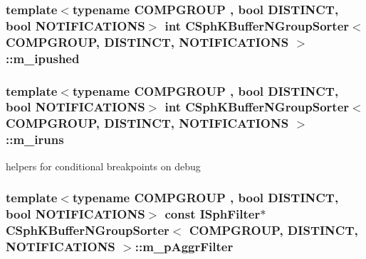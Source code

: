 \hypertarget{classCSphKBufferNGroupSorter_a3308b6c1f46dc67f83b9c032411c5511}{
\subsubsection[{m\-\_\-ipushed}]{\setlength{\rightskip}{0pt plus 5cm}template$<$typename C\-O\-M\-P\-G\-R\-O\-U\-P , bool D\-I\-S\-T\-I\-N\-C\-T, bool N\-O\-T\-I\-F\-I\-C\-A\-T\-I\-O\-N\-S$>$ {\bf int} {\bf C\-Sph\-K\-Buffer\-N\-Group\-Sorter}$<$ C\-O\-M\-P\-G\-R\-O\-U\-P, D\-I\-S\-T\-I\-N\-C\-T, N\-O\-T\-I\-F\-I\-C\-A\-T\-I\-O\-N\-S $>$\-::m\-\_\-ipushed\hspace{0.3cm}{\ttfamily [protected]}}}\label{classCSphKBufferNGroupSorter_a3308b6c1f46dc67f83b9c032411c5511}
\hypertarget{classCSphKBufferNGroupSorter_a699681aaca6fb381c56b824f1844b4e3}{
\subsubsection[{m\-\_\-iruns}]{\setlength{\rightskip}{0pt plus 5cm}template$<$typename C\-O\-M\-P\-G\-R\-O\-U\-P , bool D\-I\-S\-T\-I\-N\-C\-T, bool N\-O\-T\-I\-F\-I\-C\-A\-T\-I\-O\-N\-S$>$ {\bf int} {\bf C\-Sph\-K\-Buffer\-N\-Group\-Sorter}$<$ C\-O\-M\-P\-G\-R\-O\-U\-P, D\-I\-S\-T\-I\-N\-C\-T, N\-O\-T\-I\-F\-I\-C\-A\-T\-I\-O\-N\-S $>$\-::m\-\_\-iruns\hspace{0.3cm}{\ttfamily [protected]}}}\label{classCSphKBufferNGroupSorter_a699681aaca6fb381c56b824f1844b4e3}


helpers for conditional breakpoints on debug 

\hypertarget{classCSphKBufferNGroupSorter_accb42324fca2c452e69aecd5c15faa22}{
\subsubsection[{m\-\_\-p\-Aggr\-Filter}]{\setlength{\rightskip}{0pt plus 5cm}template$<$typename C\-O\-M\-P\-G\-R\-O\-U\-P , bool D\-I\-S\-T\-I\-N\-C\-T, bool N\-O\-T\-I\-F\-I\-C\-A\-T\-I\-O\-N\-S$>$ const {\bf I\-Sph\-Filter}$\ast$ {\bf C\-Sph\-K\-Buffer\-N\-Group\-Sorter}$<$ C\-O\-M\-P\-G\-R\-O\-U\-P, D\-I\-S\-T\-I\-N\-C\-T, N\-O\-T\-I\-F\-I\-C\-A\-T\-I\-O\-N\-S $>$\-::m\-\_\-p\-Aggr\-Filter\hspace{0.3cm}{\ttfamily [protected]}}}\label{classCSphKBufferNGroupSorter_accb42324fca2c452e69aecd5c15faa22}


